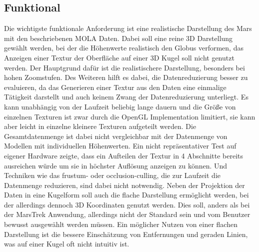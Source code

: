 \subsection{Funktional}
Die wichtigste funktionale Anforderung ist eine realistische Darstellung des Mars mit den beschriebenen MOLA Daten. Dabei soll eine reine 3D Darstellung gewählt werden, bei der die Höhenwerte realistisch den Globus verformen, das Anzeigen einer Textur der Oberfläche auf einer 3D Kugel soll nicht genutzt werden. Der Hauptgrund dafür ist die realistischere Darstellung, besonders bei hohen Zoomstufen. Des Weiteren hilft es dabei, die Datenreduzierung besser zu evaluieren, da das Generieren einer Textur aus den Daten eine einmalige Tätigkeit darstellt und auch keinem Zwang der Datenreduzierung unterliegt. Es kann unabhängig von der Laufzeit beliebig lange dauern und die Größe von einzelnen Texturen ist zwar durch die OpenGL Implementation limitiert, sie kann aber leicht in einzelne kleinere Texturen aufgeteilt werden. Die Gesamtdatenmenge ist dabei nicht vergleichbar mit der Datenmenge von Modellen mit individuellen Höhenwerten. Ein nicht repräsentativer Test auf eigener Hardware zeigte, dass ein Aufteilen der Textur in 4 Abschnitte bereits ausreichen würde um sie in höchster Auflösung anzeigen zu können. Und Techniken wie das frustum- oder occlusion-culling, die zur Laufzeit die Datenmenge reduzieren, sind dabei nicht notwendig. Neben der Projektion der Daten in eine Kugelform soll auch die flache Darstellung ermöglicht werden, bei der allerdings dennoch 3D Koordinaten genutzt werden. Dies soll, anders als bei der MarsTrek Anwendung, allerdings nicht der Standard sein und vom Benutzer bewusst ausgewählt werden müssen. Ein möglicher Nutzen von einer flachen Darstellung ist die bessere Einschätzung von Entfernungen und geraden Linien, was auf einer Kugel oft nicht intuitiv ist.

